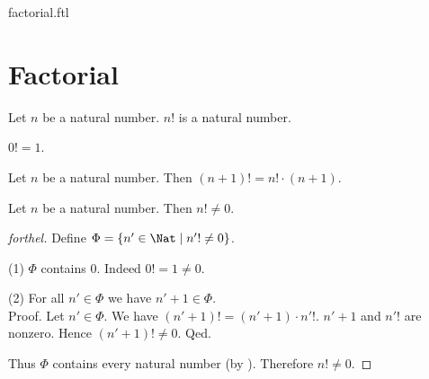 \documentclass{naproche-library}
\begin{document}
\begin{smodule}{factorial.ftl}

  \section*{Factorial}

  \begin{signature}[forthel,id=ARITHMETIC_12_0210357812531785,printid]
    Let $n$ be a natural number.
    $n!$ is a natural number.
  \end{signature}

  \begin{axiom}[forthel,id=ARITHMETIC_12_6945210541236989,printid]
    $0! = 1$.
  \end{axiom}

  \begin{axiom}[forthel,id=ARITHMETIC_12_2312015846987452,printid]
    Let $n$ be a natural number.
    Then $(n + 1)! = n! \cdot (n + 1)$.
  \end{axiom}

  \begin{proposition}[forthel,id=ARITHMETIC_12_6123519005949952,printid]
    Let $n$ be a natural number.
    Then $n! \neq 0$.
  \end{proposition}
  \begin{proof}[forthel]
    Define $\Phi = \{n' \in \Nat \mid n'! \neq 0 \}$.

    (1) $\Phi$ contains $0$.
    Indeed $0! = 1 \neq 0$.

    (2) For all $n' \in \Phi$ we have $n' + 1 \in \Phi$. \\
    Proof.
      Let $n' \in \Phi$.
      We have $(n' + 1)! = (n' + 1) \cdot n'!$.
      $n' + 1$ and $n'!$ are nonzero.
      Hence $(n' + 1)! \neq 0$.
    Qed.

    Thus $\Phi$ contains every natural number (by ).
    Therefore $n! \neq 0$.
  \end{proof}
\end{smodule}
\end{document}
